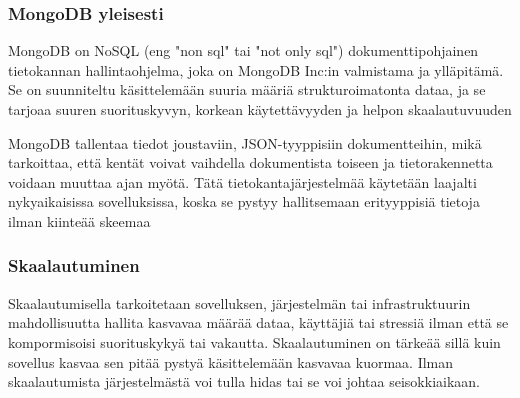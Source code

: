 







\subsubsection{MongoDB yleisesti}







MongoDB on NoSQL (eng "non sql"{} tai "not only sql"{}) dokumenttipohjainen tietokannan hallintaohjelma, joka on MongoDB Inc:in valmistama ja ylläpitämä.
Se on suunniteltu käsittelemään suuria määriä strukturoimatonta dataa, ja se tarjoaa suuren suorituskyvyn, korkean käytettävyyden ja helpon skaalautuvuuden
\medskip

MongoDB tallentaa tiedot joustaviin, JSON-tyyppisiin dokumentteihin, mikä tarkoittaa, että kentät voivat vaihdella dokumentista toiseen ja tietorakennetta voidaan muuttaa ajan myötä. 
Tätä tietokantajärjestelmää käytetään laajalti nykyaikaisissa sovelluksissa, koska se pystyy hallitsemaan erityyppisiä tietoja ilman kiinteää skeemaa
\medskip






\subsubsection{Skaalautuminen}




Skaalautumisella tarkoitetaan sovelluksen, järjestelmän tai infrastruktuurin
mahdollisuutta hallita kasvavaa määrää dataa, käyttäjiä tai stressiä ilman että se kompormisoisi suorituskykyä tai vakautta.
Skaalautuminen on tärkeää sillä kuin sovellus kasvaa sen pitää pystyä käsittelemään kasvavaa kuormaa.
Ilman skaalautumista järjestelmästä voi tulla hidas tai se voi johtaa seisokkiaikaan.
\medskip

